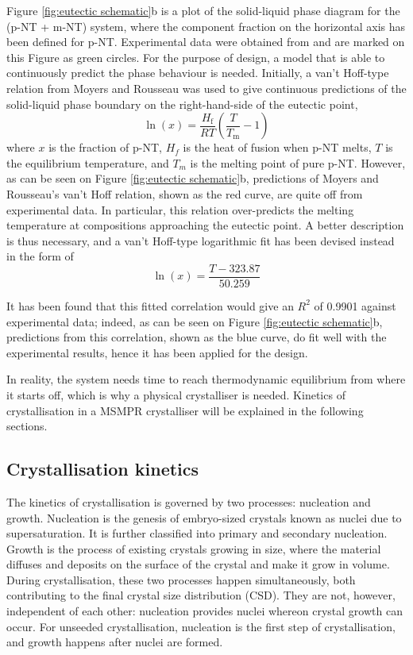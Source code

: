Figure \ref{fig:eutectic schematic}b is a plot of the solid-liquid phase diagram for the (p-NT + m-NT) system, where the component fraction on the horizontal axis has been defined for p-NT. Experimental data were obtained from \cite{noauthor_detherm_2021} and are marked on this Figure as green circles. For the purpose of design, a model that is able to continuously predict the phase behaviour is needed. Initially, a van't Hoff-type relation from Moyers and Rousseau was used to give continuous predictions of the solid-liquid phase boundary on the right-hand-side of the eutectic point, \cite{moyers_crystallization_1987}
\begin{equation}\label{eq:vantHoff}
    \ln(x) = \frac{H_{\mathrm{f}}}{R T}\left(\frac{T}{T_{\mathrm{m}}} - 1\right)
\end{equation}
where $x$ is the fraction of p-NT, $H_f$ is the heat of fusion when p-NT melts, $T$ is the equilibrium temperature, and $T_{m}$ is the melting point of pure p-NT. However, as can be seen on Figure \ref{fig:eutectic schematic}b, predictions of Moyers and Rousseau's van't Hoff relation, shown as the red curve, are quite off from experimental data. In particular, this relation over-predicts the melting temperature at compositions approaching the eutectic point. A better description is thus necessary, and a van't Hoff-type logarithmic fit has been devised instead in the form of 
\begin{equation} \label{eq:fittedvantHoffcorrelation}
    \ln(x) = \frac{T - 323.87}{50.259}
\end{equation}

\noindent It has been found that this fitted correlation would give an $R^2$ of 0.9901 against experimental data; indeed, as can be seen on Figure \ref{fig:eutectic schematic}b, predictions from this correlation, shown as the blue curve, do fit well with the experimental results, hence it has been applied for the design.

In reality, the system needs time to reach thermodynamic equilibrium from where it starts off, which is why a physical crystalliser is needed. Kinetics of crystallisation in a MSMPR crystalliser will be explained in the following sections.

\subsection{Crystallisation kinetics}
The kinetics of crystallisation is governed by two processes: nucleation and growth. Nucleation is the genesis of embryo-sized crystals known as nuclei due to supersaturation. \cite{richardson_chemical_nodate} It is further classified into primary and secondary nucleation. Growth is the process of existing crystals growing in size, where the material diffuses and deposits on the surface of the crystal and make it grow in volume. During crystallisation, these two processes happen simultaneously, both contributing to the final crystal size distribution (CSD). \cite{richardson_chemical_nodate} They are not, however, independent of each other: nucleation provides nuclei whereon crystal growth can occur. For unseeded crystallisation, nucleation is the first step of crystallisation, and growth happens after nuclei are formed. \cite{Mullin}

